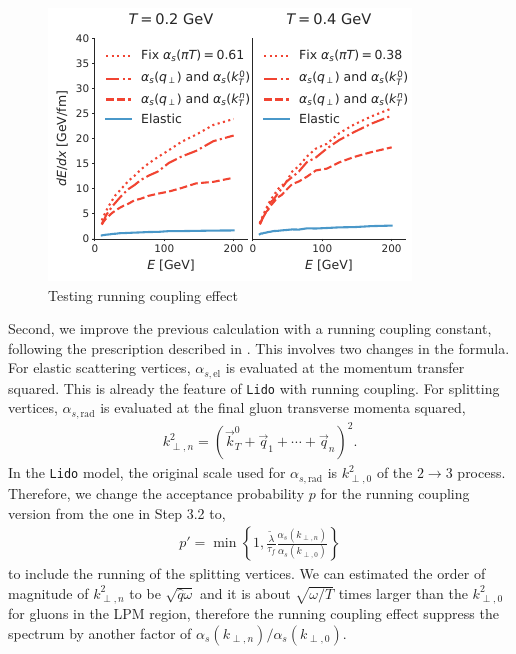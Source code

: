 \documentclass[aps, prc, reprint, amsmath, groupedaddress, nofootinbib]{revtex4-1}
\begin{document}
\begin{figure}
\includegraphics[width=\columnwidth]{Eloss_infinite_run.pdf}
\caption{Testing running coupling effect }
\label{fig:run}
\end{figure}
Second, we improve the previous calculation with a running coupling constant, following the prescription described in \cite{Arnold:2008zu}.
This involves two changes in the formula. 
For elastic scattering vertices, $\alpha_{s, \textrm{el}}$ is evaluated at the momentum transfer squared. 
This is already the feature of {\tt Lido} with running coupling.
For splitting vertices,  $\alpha_{s, \textrm{rad}}$ is evaluated at the final gluon transverse momenta squared,
\begin{eqnarray}\label{eq:kTn}
k_{\perp,n}^2 = \left(\vec{k}_T^0+\vec{q}_1+\cdots+\vec{q}_n\right)^2.
\end{eqnarray} 
In the {\tt Lido} model, the original scale used for $\alpha_{s, \textrm{rad}}$ is $k_{\perp,0}^2$ of the $2\rightarrow 3$ process.
Therefore, we change the acceptance probability $p$ for the running coupling version from the one in Step 3.2 to,
\begin{eqnarray}
p' = \min\left\{1, \frac{\tilde{\lambda}}{\tau_f}\frac{\alpha_s(k_{\perp,n})}{\alpha_s(k_{\perp,0})}\right\}
\end{eqnarray}
to include the running of the splitting vertices.
We can estimated the order of magnitude of $k_{\perp,n}^2$ to be $\sqrt{\hat{q}\omega}$ and it is about $\sqrt{\omega/T}$ times larger than the $k_{\perp,0}^2$ for gluons in the LPM region, therefore the running coupling effect suppress the spectrum by another factor of $\alpha_s(k_{\perp,n})/\alpha_s(k_{\perp,0})$.
\end{document}
